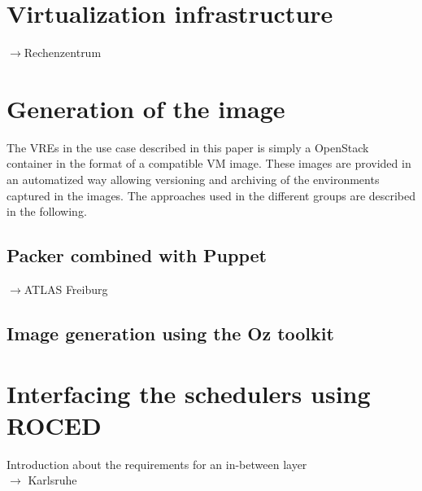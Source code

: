 \section{Virtualization infrastructure}
\label{sec:openstack}
$\to$Rechenzentrum\\

\section{Generation of the image}
The VREs in the use case described in this paper is simply a OpenStack container
in the format of a compatible VM image.
These images are provided in an automatized
way allowing versioning and archiving of the environments captured in
the images. The approaches used in the
different groups are described in the following.

\subsection{Packer combined with Puppet}
$\to$ATLAS Freiburg\\




\subsection{Image generation using the Oz toolkit}


\section{Interfacing the schedulers using ROCED}
Introduction about the requirements for an in-between layer
\\$\to $ Karlsruhe
